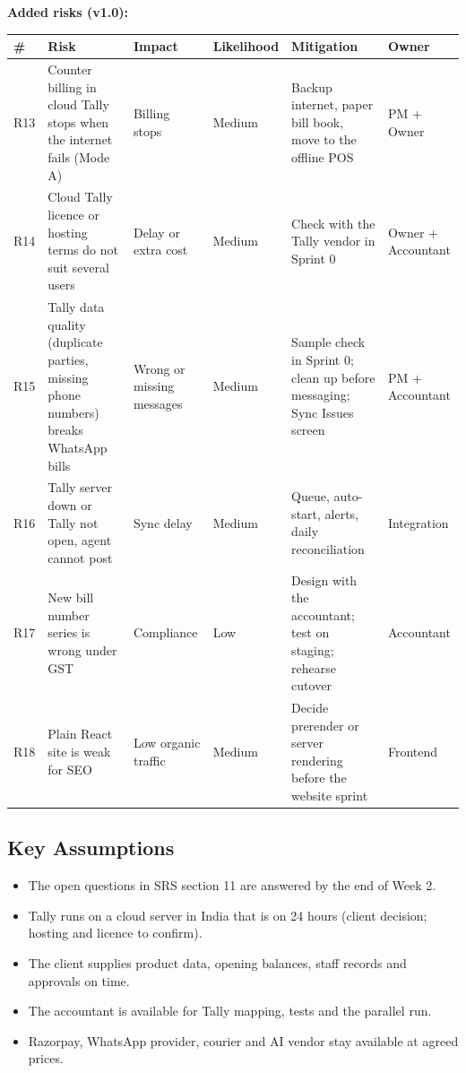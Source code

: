 \documentclass[11pt,a4paper]{article}
\newcommand{\hdr}{\rowcolor{hdrgray}\bfseries}
\begin{document}
\textbf{Added risks (v1.0):}
{\small
\begin{longtable}{L{0.9cm}L{3.8cm}L{2.2cm}L{1.8cm}L{5.2cm}L{2.6cm}}
\hdr \# & Risk & Impact & Likelihood & Mitigation & Owner \\ \endhead
R13 & Counter billing in cloud Tally stops when the internet fails (Mode A) & Billing stops & Medium & Backup internet, paper bill book, move to the offline POS & PM + Owner \\
R14 & Cloud Tally licence or hosting terms do not suit several users & Delay or extra cost & Medium & Check with the Tally vendor in Sprint 0 & Owner + Accountant \\
R15 & Tally data quality (duplicate parties, missing phone numbers) breaks WhatsApp bills & Wrong or missing messages & Medium & Sample check in Sprint 0; clean up before messaging; Sync Issues screen & PM + Accountant \\
R16 & Tally server down or Tally not open, agent cannot post & Sync delay & Medium & Queue, auto-start, alerts, daily reconciliation & Integration \\
R17 & New bill number series is wrong under GST & Compliance & Low & Design with the accountant; test on staging; rehearse cutover & Accountant \\
R18 & Plain React site is weak for SEO & Low organic traffic & Medium & Decide prerender or server rendering before the website sprint & Frontend \\
\end{longtable}
}

\subsection{Key Assumptions}
\begin{itemize}
\item The open questions in SRS section 11 are answered by the end of Week 2.
\item Tally runs on a cloud server in India that is on 24 hours (client decision; hosting and licence to confirm).
\item The client supplies product data, opening balances, staff records and approvals on time.
\item The accountant is available for Tally mapping, tests and the parallel run.
\item Razorpay, WhatsApp provider, courier and AI vendor stay available at agreed prices.
\end{itemize}
\end{document}
